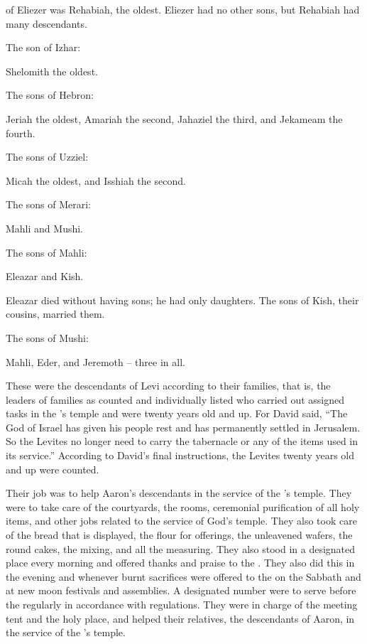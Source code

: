 {of Eliezer
was Rehabiah,
the oldest.
Eliezer
had no
other
sons,
but Rehabiah
had many
descendants.
\par }{\PP {}The son
of Izhar:
\par }{\PP Shelomith
the oldest.
\par }{\PP {}The sons
of Hebron:
\par }{\PP Jeriah
the oldest,
Amariah
the second,
Jahaziel
the third,
and Jekameam
the fourth.
\par }{\PP {}The sons
of Uzziel:
\par }{\PP Micah
the oldest,
and Isshiah
the second.
\par }{\PP {}The sons
of Merari:
\par }{\PP Mahli
and Mushi.
\par }{\PP The sons
of Mahli:
\par }{\PP Eleazar
and Kish.
\par }{\PP {}Eleazar
died
without
having sons;
he had
only
daughters.
The sons
of Kish,
their cousins,
married them.
\par }{\PP {}The sons
of Mushi:
\par }{\PP Mahli,
Eder,
and Jeremoth
– three in all.
\par }{\PP {}These
were the descendants
of Levi
according to their families,
that is, the leaders
of families
as counted
and individually
listed who carried out
assigned
tasks
in the
{}’s
temple
and were twenty
years
old
and up.
For
David
said,
“The
{}
God
of Israel
has given his people
rest
and has permanently
settled
in Jerusalem.
So
the Levites
no
longer need to carry
the tabernacle
or any
of the items
used in its service.”
According to David’s
final
instructions,
the Levites
twenty
years
old and up were
counted.
\par }{\PP {}Their job was to help Aaron’s
descendants
in the service
of the
{}’s
temple.
They were to take care of the courtyards,
the rooms,
ceremonial
purification
of all
holy
items, and other jobs
related to the service
of God’s
temple.
They also took care of the bread
that is displayed,
the flour
for offerings,
the unleavened
wafers,
the round cakes,
the mixing,
and all
the measuring.
They also
stood
in a designated place every morning
and offered thanks
and praise
to the
{}. They also
did this
in the evening
and whenever
burnt sacrifices
were offered
to the
{}
on the Sabbath
and at new moon
festivals
and assemblies.
A designated number
were to serve before
the {}
regularly
in accordance with regulations.
They were in charge
of the meeting
tent
and the
holy
place, and helped
their relatives,
the descendants
of Aaron,
in the service
of the
{}’s
temple.

}
